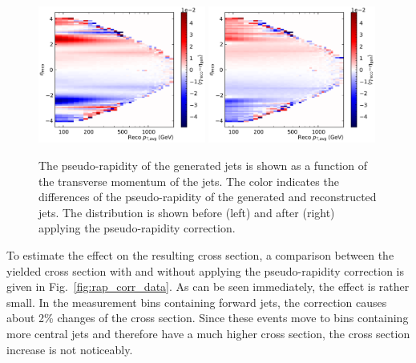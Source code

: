 \begin{figure}[htbp]
    \centering
    \includegraphics[width=0.49\textwidth]{figures/measurement/genvsreco_eta_vs_genpt.pdf}\hfill
    \includegraphics[width=0.49\textwidth]{figures/measurement/genvsreco_eta_vs_genpt_corr.pdf}
    \caption[Differences of pseudo-rapidity of reconstructed jets and particle-level jets as a function of the reconstructed jet \pt]
            {The pseudo-rapidity of the
            generated jets is shown as a function of the transverse momentum of
            the jets. The color indicates the differences of the pseudo-rapidity
            of the generated and reconstructed jets. The distribution is shown
            before (left) and after (right) applying the pseudo-rapidity
        correction.}
    \label{fig:jet_eta_corr_vs_pt}
\end{figure}

To estimate the effect on the resulting cross section, a comparison between the
yielded cross section with and without applying the pseudo-rapidity correction
is given in Fig.~\ref{fig:rap_corr_data}. As can be seen immediately, the effect is
rather small. In the measurement bins containing forward jets, the correction
causes about 2\% changes of the cross section. Since these events move to bins
containing more central jets and therefore have a much higher cross section, the
cross section increase is not noticeably.

